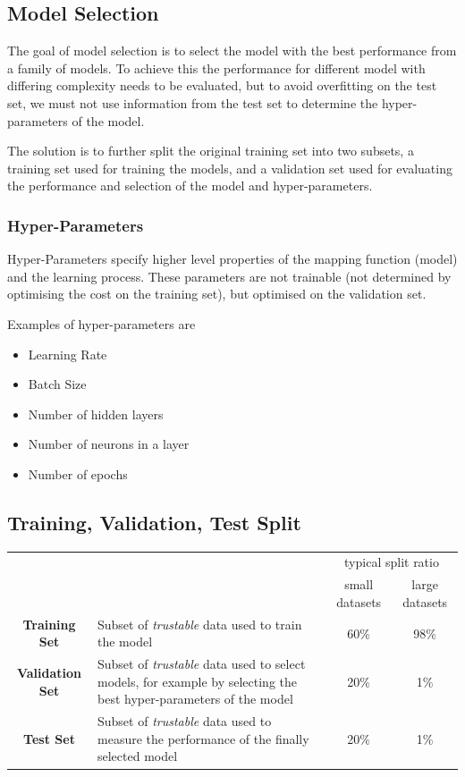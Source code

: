 \documentclass[11pt]{article}
\begin{document}
\subsection{Model Selection}
The goal of model selection is to select the model with the best performance from a family of models. To achieve this the performance for different model with differing complexity needs to be evaluated, but to avoid overfitting on the test set, we must not use information from the test set to determine the hyper-parameters of the model.

The solution is to further split the original training set into two subsets, a training set used for training the models, and a validation set used for evaluating the performance and selection of the model and hyper-parameters.

\subsubsection{Hyper-Parameters}

Hyper-Parameters specify higher level properties of the mapping function (model) and the learning process. These parameters are not trainable (not determined by optimising the cost on the training set), but optimised on the validation set.

\vspace{1em}
\noindent
Examples of hyper-parameters are
\begin{itemize}
	\item Learning Rate
	\item Batch Size
	\item Number of hidden layers
	\item Number of neurons in a layer
	\item Number of epochs
\end{itemize}

\subsection{Training, Validation, Test Split}

\begin{tabularx}{\linewidth}{c X c || c }
	& & \multicolumn{2}{c}{typical split ratio} \\
	& & small datasets & large datasets\\
	\hline
	\textbf{Training Set} & Subset of \emph{trustable} data used to train the model & 60\% & 98\%\\
	\hline
	\textbf{Validation Set} & Subset of \emph{trustable} data used to select models, for example by selecting the best hyper-parameters of the model & 20\% & 1\%\\
	\hline
	\textbf{Test Set} & Subset of \emph{trustable} data used to measure the performance of the finally selected model & 20\% & 1\%\\
	\hline
\end{tabularx}
\end{document}
